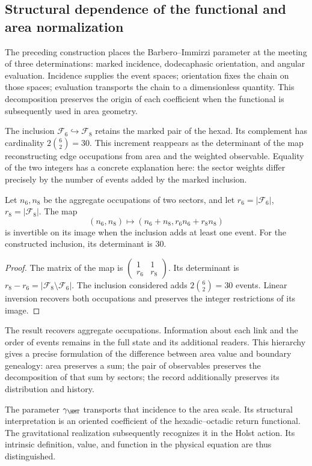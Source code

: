 \subsection{Structural dependence of the functional and area normalization}

The preceding construction places the Barbero--Immirzi parameter at the
meeting of three determinations: marked incidence, dodecaphasic
orientation, and angular evaluation. Incidence supplies the event
spaces; orientation fixes the chain on those spaces;
evaluation transports the chain to a dimensionless quantity. This
decomposition preserves the origin of each coefficient when
the functional is subsequently used in area geometry.

The inclusion \(\mathcal F_6\hookrightarrow\mathcal F_8\) retains
the marked pair of the hexad. Its complement has cardinality
\(2\binom62=30\). This increment reappears as the determinant of the
map reconstructing edge occupations from area and
the weighted observable. Equality of the two integers has a concrete
explanation here: the sector weights differ precisely
by the number of events added by the marked inclusion.

\begin{proposition}
Let \(n_6,n_8\) be the aggregate occupations of two sectors, and let
\(r_6=|\mathcal F_6|\), \(r_8=|\mathcal F_8|\). The map
\[
 (n_6,n_8)\longmapsto(n_6+n_8,r_6n_6+r_8n_8)
\]
is invertible on its image when the inclusion adds at least one
event. For the constructed inclusion, its determinant is 30.
\end{proposition}
\begin{proof}
The matrix of the map is
\(\left(\begin{smallmatrix}1&1\\r_6&r_8\end{smallmatrix}\right)\).
Its determinant is \(r_8-r_6=|\mathcal F_8\setminus\mathcal F_6|\).
The inclusion considered adds \(2\binom62=30\) events. Linear
inversion recovers both occupations and preserves the integer restrictions
of its image.
\end{proof}

The result recovers aggregate occupations. Information about
each link and the order of events remains in the full state
and its additional readers. This hierarchy gives a precise formulation
of the difference between area value and boundary genealogy:
area preserves a sum; the pair of observables preserves the
decomposition of that sum by sectors; the record additionally preserves
its distribution and history.

The parameter \(\gamma_{\HMT}\) transports that incidence to the area
scale. Its structural interpretation is an oriented coefficient
of the hexadic--octadic return functional. The gravitational realization
subsequently recognizes it in the Holst action. Its intrinsic
definition, value, and function in the physical equation are thus distinguished.
